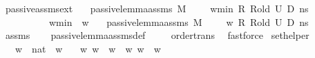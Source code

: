 \begin{isabellebody}
\endisatagproof
{\isafoldproof}%
%
\isadelimproof
\isanewline
%
\endisadelimproof
\isanewline
{}\isamarkupfalse%
\ passive{\isacharunderscore}{\kern0pt}assms{\isacharunderscore}{\kern0pt}{}{\isacharunderscore}{\kern0pt}ext{\isacharcolon}{\kern0pt}\isanewline
\ \ \ {\isachardoublequoteopen}passive{\isacharunderscore}{\kern0pt}lemma{\isacharunderscore}{\kern0pt}assms{\isacharunderscore}{\kern0pt}{}\ M\ {\isasymLambda}\ {\isasymLambda}{\isacharprime}{\kern0pt}\ {\isasymGamma}\ {\isasymOmega}\ w{\isacharunderscore}{\kern0pt}min\ R\ R{\isacharunderscore}{\kern0pt}old\ U{}\ D{}\ ns{\isachardoublequoteclose}\ \ \isanewline
\ \ \ \ \ \ \ \ \ \ {\isachardoublequoteopen}w{\isacharunderscore}{\kern0pt}min\ {\isasymle}\ w{\isacharprime}{\kern0pt}{\isachardoublequoteclose}\isanewline
\ \ \ {\isachardoublequoteopen}passive{\isacharunderscore}{\kern0pt}lemma{\isacharunderscore}{\kern0pt}assms{\isacharunderscore}{\kern0pt}{}\ M\ {\isasymLambda}\ {\isasymLambda}{\isacharprime}{\kern0pt}\ {\isasymGamma}\ {\isasymOmega}\ w{\isacharprime}{\kern0pt}\ R\ R{\isacharunderscore}{\kern0pt}old\ U{}\ D{}\ ns{\isachardoublequoteclose}\isanewline
%
\isadelimproof
\ \ %
\endisadelimproof
%
\isatagproof
{}\isamarkupfalse%
\ assms\isanewline
\ \ \isamarkupfalse%
\ passive{\isacharunderscore}{\kern0pt}lemma{\isacharunderscore}{\kern0pt}assms{\isacharunderscore}{\kern0pt}{}{\isacharunderscore}{\kern0pt}def\ \isanewline
\ \ \isamarkupfalse%
\ order{\isachardot}{\kern0pt}trans\ \isamarkupfalse%
\ fastforce%
\endisatagproof
{\isafoldproof}%
%
\isadelimproof
\isanewline
%
\endisadelimproof
\isanewline
{}\isamarkupfalse%
\ set{\isacharunderscore}{\kern0pt}helper{\isacharcolon}{\kern0pt}\ \isanewline
\ \ \ {\isachardoublequoteopen}{\isacharparenleft}{\kern0pt}w{}\ {\isacharcolon}{\kern0pt}{\isacharcolon}{\kern0pt}\ nat{\isacharparenright}{\kern0pt}\ {\isasymle}\ w{}{\isachardoublequoteclose}\isanewline
\ \ \ {\isachardoublequoteopen}{\isacharbraceleft}{\kern0pt}w{\isachardot}{\kern0pt}\ w\ {\isasymge}\ w{}{\isacharbraceright}{\kern0pt}\ {\isasymsubseteq}\ {\isacharbraceleft}{\kern0pt}w{\isachardot}{\kern0pt}\ w\ {\isasymge}\ w{}{\isacharbraceright}{\kern0pt}{\isachardoublequoteclose}\isanewline
%
\isadelimproof
\ \ %
\endisadelimproof

\end{isabellebody}
